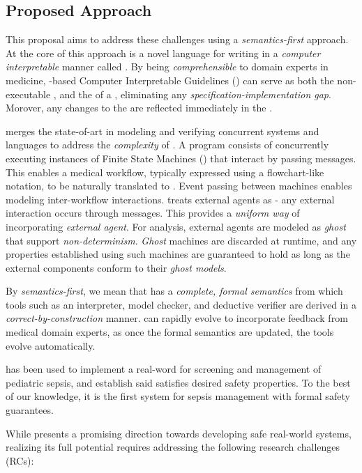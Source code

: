 \subsection{Proposed Approach}

This proposal aims to address these challenges
using a \emph{semantics-first} approach. At the core of this approach
is a novel language for writing \BPGs{} in a \emph{computer interpretable}
manner called \MediK{}. By being \emph{comprehensible} to domain experts in medicine, \MediK{}-based
Computer Interpretable Guidelines (\CIGs{}) can serve as both the
non-executable \BPG{}, and the \BPGLogic{} of a \CDSS{}, eliminating any
\emph{specification-implementation gap}. Morover, any changes to the
\CIG{} are reflected immediately in the \CDSS{}.

\MediK{} merges the state-of-art in modeling and verifying concurrent systems and
\CIG{} languages to address the \emph{complexity} of \CDSSs{}.
A \MediK{} program consists of concurrently executing instances of
Finite State Machines (\FSMs{}) that interact by passing messages.
This enables a medical workflow, typically expressed using a flowchart-like
notation, to be naturally translated to \FSM{}. Event passing between machines
enables modeling inter-workflow interactions. \MediK{} treats
external agents as \FSMs{} - any external interaction occurs
through messages. This provides a \emph{uniform way} of incorporating
\emph{external agent}. For analysis, external agents are modeled as \emph{ghost}
\FSMs{} that support \emph{non-determinism}. \emph{Ghost} machines are discarded
at runtime, and any properties established using such machines are guaranteed
to hold as long as the external components conform to their \emph{ghost models}.

By \emph{semantics-first}, we mean that \MediK{}
has a \emph{complete, formal semantics}  from which tools such as an interpreter, model checker,
and deductive verifier are derived in a \emph{correct-by-construction}
manner. \MediK{} can rapidly evolve to incorporate feedback from
medical domain experts, as once the formal semantics are updated, the
tools evolve automatically.

\MediK{} has been used to implement a real-word \CDSS{} for screening and
management of pediatric sepsis, and establish said \CDSS{} satisfies desired
safety properties. To the best of our knowledge, it is the first system
for sepsis management with formal safety guarantees.

While \MediK{} presents a promising direction towards developing safe real-world
systems, realizing its full potential requires addressing the following research
challenges (RCs):

